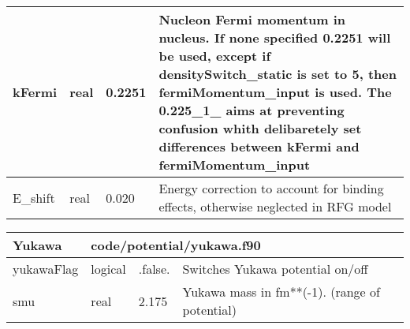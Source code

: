 \documentclass{article}
\begin{document}
\begin{longtable}{llll}
\midrule
kFermi & \begin{minipage}[t]{2cm}real\end{minipage} & \begin{minipage}[t]{2cm}0.2251\end{minipage} & \begin{minipage}[t]{12cm}Nucleon Fermi momentum in nucleus. If none specified 0.2251 will be used, except if densitySwitch\_static is set to 5, then fermiMomentum\_input is used. The 0.225\_1\_ aims at preventing confusion whith delibaretely set differences between kFermi and fermiMomentum\_input\end{minipage}\\*
\midrule
E\_shift & \begin{minipage}[t]{2cm}real\end{minipage} & \begin{minipage}[t]{2cm}0.020\end{minipage} & \begin{minipage}[t]{12cm}Energy correction to account for binding effects, otherwise neglected in RFG model\end{minipage}\\*
\bottomrule
\end{longtable}
{ }




\begin{longtable}{llll}
\toprule
\textbf{\large{Yukawa}} & \multicolumn{3}{l}{\footnotesize{code/potential/yukawa.f90}}\\*
\midrule
\endfirsthead
\midrule
\endhead
yukawaFlag & \begin{minipage}[t]{2cm}logical\end{minipage} & \begin{minipage}[t]{2cm}.false.\end{minipage} & \begin{minipage}[t]{12cm}Switches Yukawa potential on/off\end{minipage}\\*
\midrule
smu & \begin{minipage}[t]{2cm}real\end{minipage} & \begin{minipage}[t]{2cm}2.175\end{minipage} & \begin{minipage}[t]{12cm}Yukawa mass in fm**(-1). (range of potential)\end{minipage}\\*
\bottomrule
\end{longtable}
{ }
\end{document}
